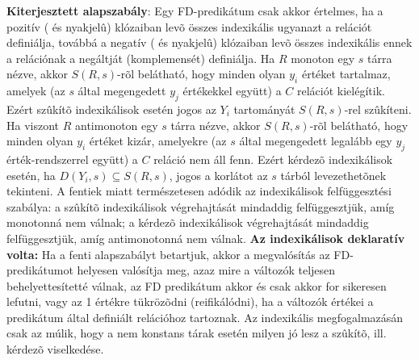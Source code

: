 {\bf Kiterjesztett alapszabály}: Egy FD-predikátum csak akkor
értelmes, ha a pozitív (\cd{+:} és  nyakjelû) klózaiban levõ összes
indexikális ugyanazt a relációt definiálja, továbbá a negatív (\cd{-:} és
 nyakjelû) klózaiban levõ összes indexikális ennek a relációnak a
negáltját (komplemensét) definiálja.
\br
Ha $R$ monoton egy $s$ tárra nézve, akkor $S(R,s)$-rõl belátható,
hogy minden olyan $y_i$ értéket tartalmaz, amelyek (az $s$ által
megengedett $y_j$ értékekkel együtt) a $C$ relációt
kielégítik. Ezért szûkítõ indexikálisok esetén jogos az $Y_i$
tartományát $S(R,s)$-rel szûkíteni. Ha viszont $R$ antimonoton egy $s$ tárra
nézve, akkor $S(R,s)$-rõl belátható, hogy minden olyan $y_i$ értéket kizár,
amelyekre (az $s$ által megengedett legalább egy $y_j$ érték-rendszerrel együtt)
a $C$ reláció nem áll fenn. Ezért kérdezõ indexikálisok esetén, ha $D(Y_i,s)
\subseteq S(R,s)$, jogos a korlátot az $s$ tárból levezethetõnek
tekinteni. A fentiek miatt természetesen adódik az indexikálisok
felfüggesztési szabálya: a szûkítõ indexikálisok végrehajtását
mindaddig felfüggesztjük, amíg monotonná nem válnak; a kérdezõ
indexikálisok végrehajtását mindaddig felfüggesztjük, amíg
antimonotonná nem válnak.
\br
{\bf Az indexikálisok deklaratív volta:} Ha a fenti alapszabályt
betartjuk, akkor a \clpfd megvalósítás az FD-predikátumot helyesen
valósítja meg, azaz mire a változók teljesen behelyettesítetté
válnak, az FD predikátum akkor és csak akkor for sikeresen lefutni, vagy
az 1 értékre tükrözõdni (reifikálódni), ha a változók értékei a
predikátum által definiált relációhoz tartoznak. Az indexikális
megfogalmazásán csak az múlik, hogy a nem konstans tárak esetén milyen
jó lesz a szûkítõ, ill. kérdezõ viselkedése.
